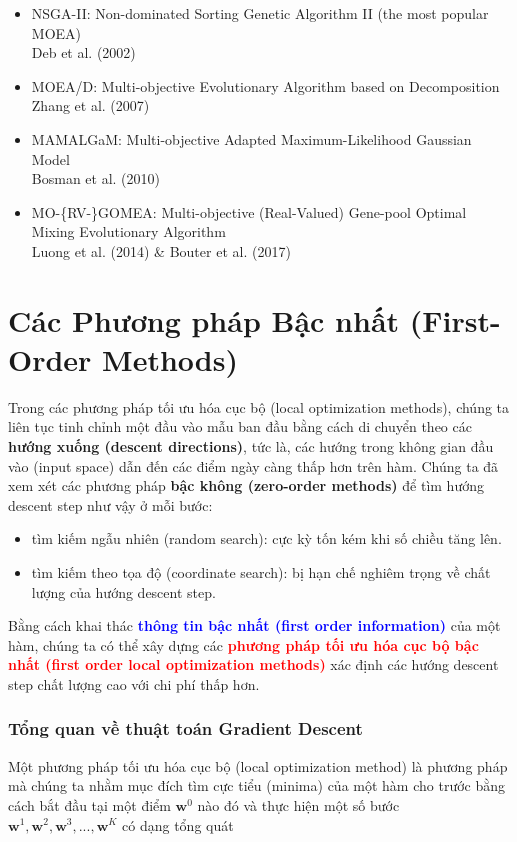 \documentclass{book}
\begin{document}
\begin{itemize}
    \item NSGA-II: Non-dominated Sorting Genetic Algorithm II (the most popular MOEA)\\
    Deb et al. (2002)
    \item MOEA/D: Multi-objective Evolutionary Algorithm based on Decomposition\\
    Zhang et al. (2007)
    \item MAMALGaM: Multi-objective Adapted Maximum-Likelihood Gaussian Model\\
    Bosman et al. (2010)
    \item MO-\{RV-\}GOMEA: Multi-objective (Real-Valued) Gene-pool Optimal Mixing Evolutionary Algorithm\\
    Luong et al. (2014) \& Bouter et al. (2017)
\end{itemize}
\chapter{Các Phương pháp Bậc nhất (First-Order Methods)}
Trong các phương pháp tối ưu hóa cục bộ (local optimization methods), chúng ta liên tục tinh chỉnh một đầu vào mẫu ban đầu bằng cách di chuyển theo các \textbf{hướng xuống (descent directions)}, tức là, các hướng trong không gian đầu vào (input space) dẫn đến các điểm ngày càng thấp hơn trên hàm.
Chúng ta đã xem xét các phương pháp \textbf{bậc không (zero-order methods)} để tìm hướng descent step như vậy ở mỗi bước:
\begin{itemize}
    \item tìm kiếm ngẫu nhiên (random search): cực kỳ tốn kém khi số chiều tăng lên.
    \item tìm kiếm theo tọa độ (coordinate search): bị hạn chế nghiêm trọng về chất lượng của hướng descent step.

\end{itemize}
Bằng cách khai thác \textbf{\textcolor{blue}{thông tin bậc nhất (first order information)}} của một hàm, chúng ta có thể xây dựng các \textbf{\textcolor{red}{phương pháp tối ưu hóa cục bộ bậc nhất (first order local optimization methods)}} xác định các hướng descent step chất lượng cao với chi phí thấp hơn.
\subsection{Tổng quan về thuật toán Gradient Descent}
Một phương pháp tối ưu hóa cục bộ (local optimization method) là phương pháp mà chúng ta nhằm mục đích tìm cực tiểu (minima) của một hàm cho trước bằng cách bắt đầu tại một điểm $\mathbf{w}^0$ nào đó và thực hiện một số bước $\mathbf{w}^1, \mathbf{w}^2, \mathbf{w}^3,...,\mathbf{w}^{K}$ có dạng tổng quát
\end{document}
